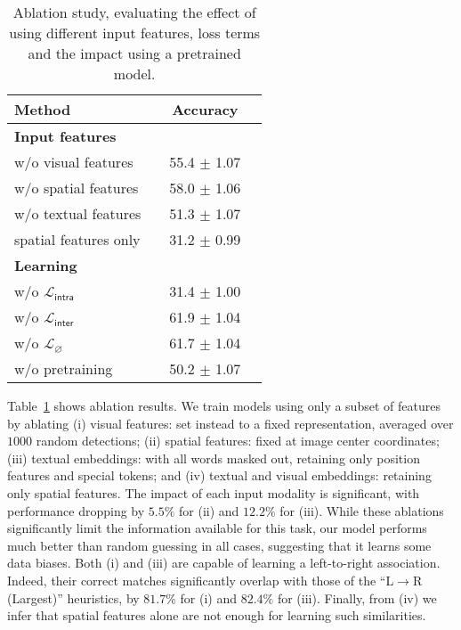 \begin{table}[t]
\centering
\setlength{\tabcolsep}{3.1pt}
\def\arraystretch{0.95}
\begin{tabularx}{0.655\columnwidth}{lccc}
\toprule
  Method  && Accuracy        \\ \midrule
  \textbf{Input features} \\
 \quad w/o visual features && 55.4 $\pm$ 1.07  \\
 \quad w/o spatial features &&  58.0 $\pm$ 1.06 \\
 \quad w/o textual features && 51.3 $\pm$ 1.07 \\
  \quad spatial features only && 31.2 $\pm$ 0.99 \\
 \midrule
 \textbf{Learning} \\
 \quad w/o $\mathcal{L}_\mathsf{intra}$ && 31.4 $\pm$ 1.00 \\
  \quad  w/o $\mathcal{L}_\mathsf{inter}$ &&  61.9 $\pm$ 1.04 \\
    \quad  w/o $\mathcal{L}_{\varnothing}$ && 61.7 $\pm$ 1.04 \\
 \quad w/o pretraining &&  50.2 $\pm$ 1.07 \\
\bottomrule
\end{tabularx}
\vspace{3pt}
\caption{Ablation study, evaluating the effect of using different input features, loss terms and the impact using a pretrained model. }\label{tab:ablations}
\end{table}
 
Table~\ref{tab:ablations} shows ablation results. 
We train models using only a subset of features by ablating (i) visual features: set instead to a fixed representation, averaged over $1000$ random detections; (ii) spatial features: fixed at image center coordinates; (iii) textual embeddings: with all words masked out, retaining only position features and special \NAME tokens; and (iv) textual and visual embeddings: retaining only spatial features.
The impact of each input modality is significant, with performance dropping by $5.5\%$ for (ii) and $12.2\%$ for (iii). While these ablations significantly limit the information available for this task, our model performs much better than random guessing in all cases, suggesting that it learns some data biases. Both (i) and (iii) are capable of learning a left-to-right association. Indeed, their correct matches significantly overlap with those of the ``L$\rightarrow$R (Largest)'' heuristics, by $81.7\%$ for (i) and $82.4\%$ for (iii). Finally, from (iv) we infer that spatial features alone are not enough for learning such similarities.

